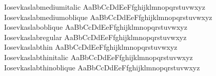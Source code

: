 \begin{tabbing}
Iosevkaslabmediumitalic \> { AaBbCcDdEeFfghijklmnopqrstuvwxyz} \\
Iosevkaslabmediumoblique \> { AaBbCcDdEeFfghijklmnopqrstuvwxyz} \\
Iosevkaslaboblique \> { AaBbCcDdEeFfghijklmnopqrstuvwxyz} \\
Iosevkaslabregular \> { AaBbCcDdEeFfghijklmnopqrstuvwxyz} \\
Iosevkaslabthin \> { AaBbCcDdEeFfghijklmnopqrstuvwxyz} \\
Iosevkaslabthinitalic \> { AaBbCcDdEeFfghijklmnopqrstuvwxyz} \\
Iosevkaslabthinoblique \> { AaBbCcDdEeFfghijklmnopqrstuvwxyz} \\
\end{tabbing}



